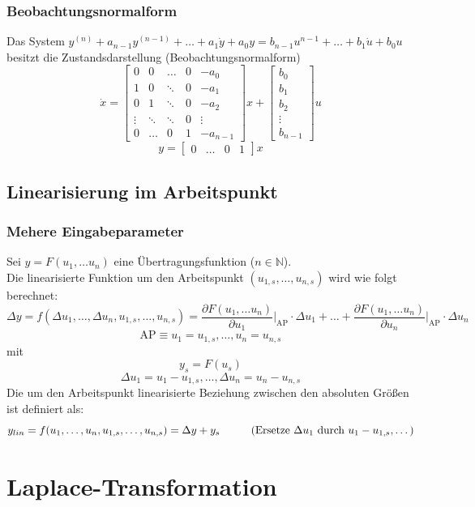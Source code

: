 \documentclass[10pt,a4paper]{article}
\newcommand{\tab}[1][1]{\hspace*{#1cm}}
\newcommand{\vect}[1]{\ensuremath{\begin{bmatrix}#1\end{bmatrix}}}
\begin{document}
\subsubsection{Beobachtungsnormalform}
Das System $y^{(n)} + a_{n-1} y^{(n-1)} + \dots + a_1 \dot y + a_0 y = b_{n-1} u^{n-1} + \dots + b_1 \dot u + b_0 u$ \\
besitzt die Zustandsdarstellung (Beobachtungsnormalform)
$$
\dot x = \begin{bmatrix}
0 & 0 & \dots & 0 & -a_0 \\
1 & 0 & \ddots & 0 & -a_1 \\
0 & 1 & \ddots & 0 & -a_2\\
\vdots & \ddots & \ddots & 0 & \vdots \\
0 & \dots & 0 & 1 & -a_{n-1}
\end{bmatrix} x + \vect{b_0 \\ b_1 \\ b_2 \\ \vdots \\ b_{n-1}} u
$$
$$
y = \vect{0 & \dots & 0 & 1} x
$$


\subsection{Linearisierung im Arbeitspunkt}
\subsubsection{Mehere Eingabeparameter}
Sei $y = F(u_1, \dots u_n)$ eine Übertragungsfunktion ($n \in \mathbb{N}$). \\
Die linearisierte Funktion um den Arbeitspunkt $(u_{1,s}, \dots, u_{n,s})$ wird wie folgt berechnet:
$$
\Delta y = f(\Delta u_1, \dots, \Delta u_n, u_{1,s}, \dots, u_{n,s}) = \frac{\partial F(u_1, \dots u_n)}{\partial u_1}\Bigg|_\textrm{AP} ⋅ \Delta u_1 + \dots + \frac{\partial F(u_1, \dots u_n)}{\partial u_n}\Bigg|_\textrm{AP} ⋅ \Delta u_n
$$
$$
	\textrm{AP} ≡ u_1 = u_{1,s}, \dots, u_n = u_{n,s}
$$
mit
$$
	y_s = F(u_s)
$$
$$
	\Delta u_1 = u_1 - u_{1,s}, \dots, \Delta u_n = u_n - u_{n,s}
$$
Die um den Arbeitspunkt linearisierte Beziehung zwischen den absoluten Größen ist definiert als:
$$
y_{lin} = f(u_1, \dots, u_n, u_{1,s}, \dots, u_{n,s}) = \Delta y + y_s  \tab \text{(Ersetze $\Delta u_1$ durch $u_1 - u_{1,s}, \dots$)}
$$

\section{Laplace-Transformation}
\end{document}
